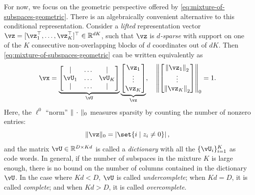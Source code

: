 \documentclass[../../book-main.tex]{subfiles}
\begin{document}
For now, we focus on the geometric perspective offered by \eqref{eq:mixture-of-subspaces-geometric}.
There is an algebraically convenient alternative to this conditional representation. Consider a \textit{lifted} representation vector $\vz = [\vz_1^\top, \dots, \vz_K^\top]^\top \in \R^{dK}$, such that $\vz$ is \textit{$d$-sparse} with support on one of the $K$ consecutive non-overlapping blocks of $d$ coordinates out of $dK$. 
Then \eqref{eq:mixture-of-subspaces-geometric} can be written equivalently as
\begin{equation}\label{eq:mixture-of-subspaces-dictionary-pre}
    \vx = 
    \underbrace{
    \begin{bmatrix} 
    | & \hdots & |  \\
    \vU_1 & \hdots & \vU_K  \\
    | & \hdots & | 
    \end{bmatrix} 
    }_{\vU}
    \underbrace{
    \begin{bmatrix} \vz_1 \\ \vdots \\ \vz_K \end{bmatrix}
    }_{\vz},
    \quad
    \norm*{
    \begin{bmatrix} \norm*{\vz_1}_2 \\ \vdots \\ \norm*{\vz_K}_2 \end{bmatrix}
    }_0 = 1.
\end{equation}
Here, the $\ell^0$ ``norm'' $\norm{\,\cdot\,}_0$ measures sparsity by counting the number of nonzero entries:
\begin{equation}\label{eq:ell-zero-norm}
    \norm{\vz}_0 = \abs*{\set{i \given z_i \neq 0}},
\end{equation}
and the matrix $\vU \in \R^{D \times Kd}$ is called a \textit{dictionary} with all the $\{\vU_i\}_{i=1}^K$ as code words. In general, if the number of subspaces in the mixture $K$ is large enough, there is no bound on the number of columns contained in the dictionary $\vU$. In the case where $Kd < D$, $\vU$ is called \textit{undercomplete};
when $Kd = D$, it is called \textit{complete}; and when $Kd > D$, it is called \textit{overcomplete}. 
\end{document}

